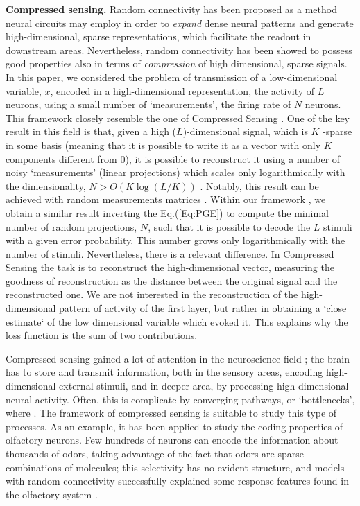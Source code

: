 \documentclass[a4paper]{article}%
\begin{document}
\textbf{Compressed sensing.} Random connectivity has been proposed as a method neural circuits may employ in order to 
 \emph{expand}  dense neural patterns
\cite[]{Barak2013FromDiscrimination,Babadi2014SparsenessRepresentations,Lindsay2017HebbianCortex,Litwin-Kumar2017OptimalConnectivity,Maoz2020LearningCircuits}
and  generate high-dimensional, sparse representations, which
facilitate the readout in downstream areas. Nevertheless, random connectivity
has been showed to possess good properties also in terms of \emph{compression}
of high dimensional, sparse signals. In this paper, we considered the problem
of transmission of a low-dimensional variable, $x$, encoded in a
high-dimensional representation, the activity of $L$ neurons, using a small
number of `measurements', the firing rate of $N$ neurons. This framework
closely resemble the one of Compressed Sensing
\cite[]{Donoho2006CompressedSensing}. One of the key result in this field is
that, given a high ($L$)-dimensional signal, which is $K$ -sparse in some
basis (meaning that it is possible to write it as a vector with only $K$
components different from $0$), it is possible to reconstruct it using a
number of noisy `measurements' (linear projections) which scales only
logarithmically with the dimensionality, $N > O\left(K \log{(L/K)}\right)$ . Notably,
this result can be achieved with random measurements matrices
\cite[]{Candes2006Near-optimalStrategies}. Within our framework , we obtain a
similar result inverting the Eq.(\ref{Eq:PGE}) to compute the minimal number
of random projections, $N$, such that it is possible to decode the $L$ stimuli
with a given error probability. This number grows only logarithmically with
the number of stimuli. Nevertheless, there is a relevant difference. In
Compressed Sensing the task is to reconstruct the high-dimensional vector,
measuring the goodness of reconstruction as the distance between the original
signal and the reconstructed one. We are not interested in the reconstruction
of the high-dimensional pattern of activity of the first layer, but rather in
obtaining a `close estimate` of the low dimensional variable which evoked it.
This explains why the loss function is the sum of two contributions.

Compressed sensing gained a lot of attention in the neuroscience field
\cite[]{Ganguli2012CompressedAnalysis}; the brain has to store and transmit
information, both in the sensory areas, encoding high-dimensional external stimuli, and in deeper area, by processing
high-dimensional neural activity. Often, this is complicate by converging
pathways, or `bottlenecks', where 
. The framework of compressed sensing is suitable to study this
type of processes. As an example, it has been applied to study the coding
properties of olfactory neurons. Few hundreds of neurons can encode the
information about thousands of odors, taking advantage of the fact that odors
are sparse combinations of molecules; this selectivity has no evident
structure, and models with random connectivity successfully explained some
response features found in the olfactory system
\cite[]{Stettler2009RepresentationsCortex,Zhang2016ASystem,Qin2019OptimalActivity}.
\end{document}
